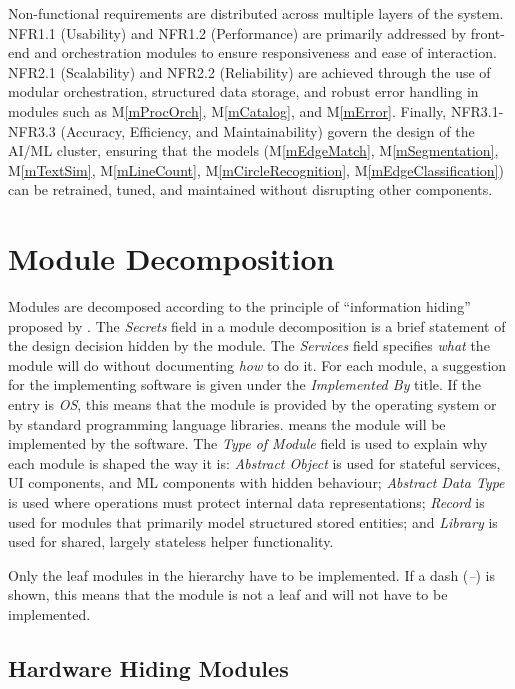 \documentclass[12pt, titlepage]{article}
\newcommand{\mref}[1]{M\ref{#1}}
\begin{document}
Non-functional requirements are distributed across multiple layers of the system. NFR1.1 (Usability) and NFR1.2 (Performance) are primarily addressed
by front-end and orchestration modules to ensure responsiveness and ease of interaction. NFR2.1 (Scalability) and NFR2.2 (Reliability) are achieved through
the use of modular orchestration, structured data storage, and robust error handling in modules such as \mref{mProcOrch}, \mref{mCatalog}, and \mref{mError}.
Finally, NFR3.1-NFR3.3 (Accuracy, Efficiency, and Maintainability) govern the design of the AI/ML cluster, ensuring that the models (\mref{mEdgeMatch},
\mref{mSegmentation}, \mref{mTextSim}, \mref{mLineCount}, \mref{mCircleRecognition}, \mref{mEdgeClassification}) can be retrained, tuned, and maintained without disrupting other components.

\section{Module Decomposition} \label{SecMD}

Modules are decomposed according to the principle of ``information hiding''
proposed by \citet{ParnasEtAl1984}. The \emph{Secrets} field in a module
decomposition is a brief statement of the design decision hidden by the
module. The \emph{Services} field specifies \emph{what} the module will do
without documenting \emph{how} to do it. For each module, a suggestion for the
implementing software is given under the \emph{Implemented By} title. If the
entry is \emph{OS}, this means that the module is provided by the operating
system or by standard programming language libraries.  \emph{\progname{}} means the
module will be implemented by the \progname{} software.
The \emph{Type of Module} field is used to explain why each module is shaped the way it is: \emph{Abstract Object} is used for stateful services, UI components, and ML components with hidden behaviour; \emph{Abstract Data Type} is used where operations must protect internal data representations; \emph{Record} is used for modules that primarily model structured stored entities; and \emph{Library} is used for shared, largely stateless helper functionality.

Only the leaf modules in the hierarchy have to be implemented. If a dash
(\emph{--}) is shown, this means that the module is not a leaf and will not have
to be implemented.

\subsection{Hardware Hiding Modules}
\end{document}
